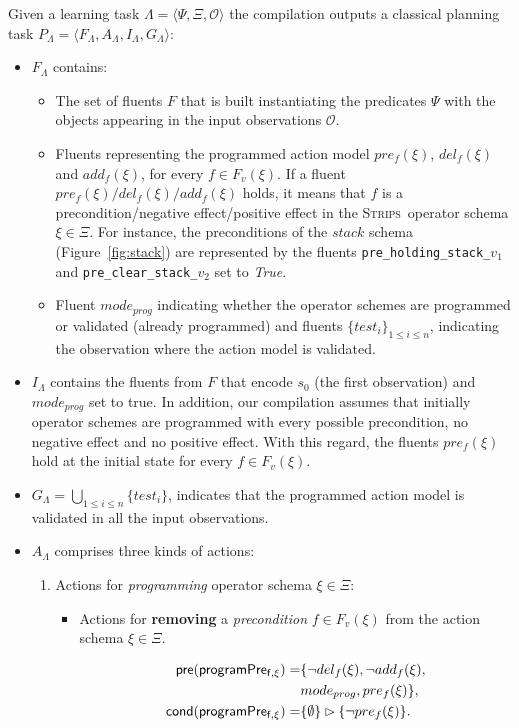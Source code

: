 \documentclass{article}
\newcommand{\tup}[1]{{\langle #1 \rangle}}
\newcommand{\pre}{\mathsf{pre}}     %
\newcommand{\cond}{\mathsf{cond}}   %
\newcommand{\strips}{\textsc{Strips}}     %
\begin{document}
Given a learning task $\Lambda=\tup{\Psi,\Xi,\mathcal{O}}$ the compilation outputs a classical planning task $P_{\Lambda}=\tup{F_{\Lambda},A_{\Lambda},I_{\Lambda},G_{\Lambda}}$:
\begin{itemize}
\item $F_{\Lambda}$ contains:
\begin{itemize}
\item The set of fluents $F$ that is built instantiating the predicates $\Psi$ with the objects appearing in the input observations $\mathcal{O}$.
\item Fluents representing the programmed action model $pre_f(\xi)$, $del_f(\xi)$ and $add_f(\xi)$, for every $f\in F_v(\xi)$. If a fluent $pre_f(\xi)/del_f(\xi)/add_f(\xi)$ holds, it means that $f$ is a precondition/negative effect/positive effect in the \strips\ operator schema $\xi\in \Xi$. For instance, the preconditions of the $stack$ schema (Figure~\ref{fig:stack}) are represented by the fluents {\small\tt pre\_holding\_stack\_$v_1$} and {\small\tt pre\_clear\_stack\_$v_2$} set to {\em True}.
\item Fluent $mode_{prog}$ indicating whether the operator schemes are programmed or validated (already programmed) and fluents $\{test_i\}_{1\leq i\leq n}$, indicating the observation where the action model is validated.
\end{itemize}
\item $I_{\Lambda}$ contains the fluents from $F$ that encode $s_0$ (the first observation) and $mode_{prog}$ set to true. In addition, our compilation assumes that initially operator schemes are programmed with every possible precondition, no negative effect and no positive effect. With this regard, the fluents $pre_f(\xi)$ hold at the initial state for every $f\in F_v(\xi)$.
\item $G_{\Lambda}=\bigcup_{1\leq i\leq n}\{test_i\}$, indicates that the programmed action model is validated in all the input observations.
\item $A_{\Lambda}$ comprises three kinds of actions:
\begin{enumerate}
\item Actions for {\em programming} operator schema $\xi\in\Xi$:
\begin{itemize}
\item Actions for {\bf removing} a {\em precondition} $f\in F_v(\xi)$ from the action schema $\xi\in\Xi$.

\begin{small}
\begin{align*}
\hspace*{7pt}\pre(\mathsf{programPre_{f,\xi}})=&\{\neg del_{f}(\xi),\neg add_{f}(\xi),\\
& mode_{prog}, pre_{f}(\xi)\},\\
\cond(\mathsf{programPre_{f,\xi}})=&\{\emptyset\}\rhd\{\neg pre_{f}(\xi)\}.
\end{align*}
\end{small}


\end{itemize}
\end{enumerate}
\end{itemize}
\end{document}
